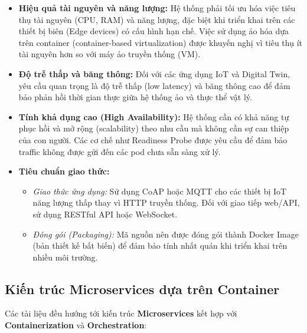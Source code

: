 \documentclass[twocolumn]{article}
\begin{document}
\begin{itemize}
	\item \textbf{Hiệu quả tài nguyên và năng lượng:} Hệ thống phải tối ưu hóa việc tiêu thụ tài nguyên (CPU, RAM) và năng lượng, đặc biệt khi triển khai trên các thiết bị biên (Edge devices) có cấu hình hạn chế. Việc sử dụng ảo hóa dựa trên container (container-based virtualization) được khuyến nghị vì tiêu thụ ít tài nguyên hơn so với máy ảo truyền thống (VM).
	
	\item \textbf{Độ trễ thấp và băng thông:} Đối với các ứng dụng IoT và Digital Twin, yêu cầu quan trọng là độ trễ thấp (low latency) và băng thông cao để đảm bảo phản hồi thời gian thực giữa hệ thống ảo và thực thể vật lý.
	
	\item \textbf{Tính khả dụng cao (High Availability):} Hệ thống cần có khả năng tự phục hồi và mở rộng (scalability) theo nhu cầu mà không cần sự can thiệp của con người. Các cơ chế như Readiness Probe được yêu cầu để đảm bảo traffic không được gửi đến các pod chưa sẵn sàng xử lý.
	
	\item \textbf{Tiêu chuẩn giao thức:}
	\begin{itemize}[noitemsep]
		\item \textit{Giao thức ứng dụng:} Sử dụng CoAP hoặc MQTT cho các thiết bị IoT năng lượng thấp thay vì HTTP truyền thống. Đối với giao tiếp web/API, sử dụng RESTful API hoặc WebSocket.
		\item \textit{Đóng gói (Packaging):} Mã nguồn nên được đóng gói thành Docker Image (bản thiết kế bất biến) để đảm bảo tính nhất quán khi triển khai trên nhiều môi trường.
	\end{itemize}
\end{itemize}

\subsection{Kiến trúc Microservices dựa trên Container}
Các tài liệu đều hướng tới kiến trúc \textbf{Microservices} kết hợp với \textbf{Containerization} và \textbf{Orchestration}:
\end{document}
